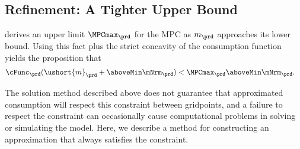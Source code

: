 \hypertarget{refinement-a-tighter-upper-bound}{}
\subsection{Refinement: A Tighter Upper Bound}
  \cite{BufferStockTheory} derives an upper limit  $\MPCmax_{\prd}$ for the MPC as $m_{\prd}$
  approaches its lower bound.  Using this
  fact plus the strict concavity of the consumption function yields the
  proposition that
  \begin{equation}\begin{gathered}\begin{aligned}
        \cFunc_{\prd}(\ushort{m}_{\prd}+\aboveMin \mNrm_{\prd}) & < \MPCmax_{\prd} \aboveMin \mNrm_{\prd}.
      \end{aligned}\end{gathered}\end{equation}

  The solution method described above does not guarantee that
  approximated consumption will respect this constraint between gridpoints, and a failure to
  respect the constraint can occasionally cause computational problems in solving
  or simulating the model.  Here, we
  describe a method for constructing an approximation that always
  satisfies the constraint.

  \begin{comment} %
    That is, the realist's consumption function is bounded from above by both
    the \textit{unconstrained} optimist's problem already treated, as well as
    by the \textit{constrained} optimist's problem, which is a 45 degree line
    originating from $\ushort{m}_{\prd}$ on the $m$-axis, as shown in
    Figure~\ref{fig:IntExpFOCInvPesReaOptNeed45Plot}. The same is true for
    the value function, as illustrated in Figure
    \ref{fig:IntExpFOCInvPesReaOptNeed45ValuePlot}.

    \hypertarget{IntExpFOCInvPesReaOptNeed45Plot}{}
    \begin{figure}
      \texttt{[image: ./Figures/IntExpFOCInvPesReaOptNeed45Plot]}
      \caption{45 Degree Line as Another Upper Bound}
      \label{fig:IntExpFOCInvPesReaOptNeed45Plot}
    \end{figure}

    \hypertarget{IntExpFOCInvPesReaOptNeed45ValuePlot}{}
    \begin{figure}
      \texttt{[image: ./Figures/IntExpFOCInvPesReaOptNeed45ValuePlot]}
      \caption{A Constrained Optimist's Value Function as Another Upper Bound}
      \label{fig:IntExpFOCInvPesReaOptNeed45ValuePlot}
    \end{figure}

  \end{comment}

